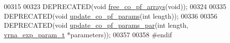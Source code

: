 \begin{DoxyCode}
00315 
00323 DEPRECATED(\textcolor{keywordtype}{void} \hyperlink{part__func__co_8h_ade3ce34ae8214811374b1d28a40dc247}{free\_co\_pf\_arrays}(\textcolor{keywordtype}{void}));
00324 
00335 DEPRECATED(\textcolor{keywordtype}{void} \hyperlink{part__func__co_8h_a6e0f36c1f9b7d9dd4bfbad914c1119e5}{update\_co\_pf\_params}(\textcolor{keywordtype}{int} length));
00336 
00356 DEPRECATED(\textcolor{keywordtype}{void} \hyperlink{part__func__co_8h_a75465d7e8793db68a434d83df9a2e794}{update\_co\_pf\_params\_par}(\textcolor{keywordtype}{int} length, 
      \hyperlink{group__energy__parameters_structvrna__exp__param__s}{vrna\_exp\_param\_t} *parameters));
00357 
00358 \textcolor{preprocessor}{#endif}
\end{DoxyCode}
